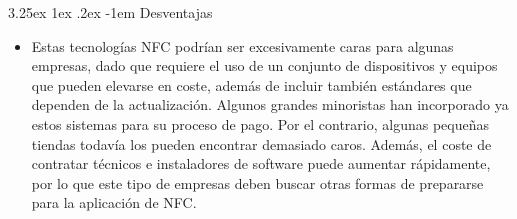 \documentclass[12pt,a4paper,onecolumn,oneside]{report}
\makeatletter
\newcounter{subsubsubsection}[subsubsection]
\renewcommand\paragraph{\@startsection{paragraph}{5}{\z@}%
  {3.25ex \@plus1ex \@minus.2ex}%
  {-1em}%
  {\normalfont\normalsize\bfseries}}
\makeatother
\begin{document}
\paragraph{Desventajas}
\begin{itemize}
\item Estas tecnologías NFC podrían ser excesivamente caras para algunas empresas, dado que requiere el uso de un conjunto de dispositivos y equipos que pueden elevarse en coste, además de incluir también estándares que dependen de la actualización. Algunos grandes minoristas han incorporado ya estos sistemas para su proceso de pago. Por el contrario, algunas pequeñas tiendas todavía los pueden encontrar demasiado caros. Además, el coste de contratar técnicos e instaladores de software puede aumentar rápidamente, por lo que este tipo de empresas deben buscar otras formas de prepararse para la aplicación de NFC.
\end{itemize}





\end{document}
